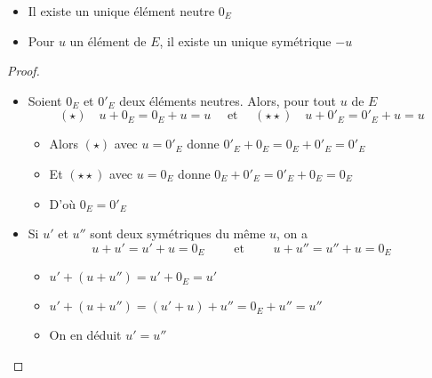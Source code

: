 \begin{frame}
\begin{proposition}
\begin{itemize}
  \item Il existe un unique élément neutre $0_{E}$
    \pause  
  \item Pour $u$ un élément de $E$, il existe un unique symétrique $-u$ 
\end{itemize}
\end{proposition}

   \pause 

\begin{proof}
\begin{itemize}
  \item Soient $0_{E}$ et $0'_{E}$ deux éléments neutres. 
  \pause Alors, pour tout $u$ de $E$
$$(\star) \quad u + 0_{E}=0_{E}+u=u \quad \text{ et } \quad (\star\star)\quad u + 0'_{E}=0'_{E}+u=u$$
\vspace*{-4ex}
   \pause
  \begin{itemize}
    \item Alors $(\star)$ avec $u=0'_{E}$ donne $0'_{E}+0_{E}=0_{E}+0'_{E}=0'_{E}$
    \pause  
    \item Et $(\star\star)$ avec $u=0_{E}$ donne $0_{E}+0'_{E}=0'_{E}+0_{E}=0_{E}$
     \pause 
    \item D'où $0_{E}=0'_{E}$
  \end{itemize}
  
   \pause 
  \item Si $u'$ et $u''$ sont deux symétriques du même $u$,
  \pause
  on a
$$u+u'=u'+u=0_{E}  \qquad \text{ et } \qquad u+u''=u''+u=0_{E}$$
\vspace*{-4ex}
\pause
  \begin{itemize}
    \item $u'+(u+u'')= u'+ 0_{E}= u'$
   \pause
    \item $u'+(u+u'')=(u'+u)+u''=0_{E}+u''=u''$
   \pause
    \item On en déduit $u'=u''$
  \end{itemize}
\end{itemize}
\vspace*{-4ex}
\end{proof}
\end{frame}


